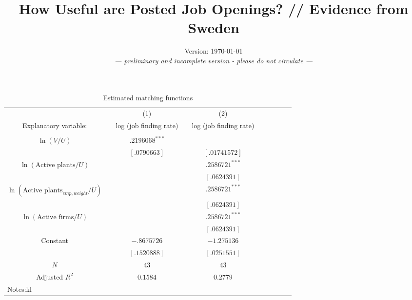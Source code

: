 \documentclass[11pt,article]{memoir}
\title{How Useful are Posted Job Openings? // Evidence from Sweden}
\date{Version: \today{}\\\emph{--- preliminary and incomplete version - please do not circulate ---}}
\begin{document}
\begin{table}%
\caption*{Estimated matching functions}
\begin{tabularx}{\linewidth}{cXcXcXcXcX}
\hline
&& (1)							
&& (2)					\\
Explanatory variable: 
&& log (job finding rate)
&& log (job finding rate) 	\\		
\hline 
\\
$\ln (V/U)$ 		
& & $ .2196068 ^{***}$          								
& & 	   				        							
& &\\[0 mm]
&&\scriptsize{$[.0790663]$}       
&&\scriptsize{$[.01741572]$}
\\
$\ln (\text{Active plants}/U)$
& 								
& 		
&	
&	$.2586721^{***}$						
\\[0 mm]
&&\scriptsize{$$}       
&&\scriptsize{$[.0624391]$}
\\
$\ln (\text{Active plants}_{emp,weight}/U)$                
& 								
& 		
&	
&	$.2586721^{***}$						
\\[0 mm]
&&\scriptsize{$$}       
&&\scriptsize{$[.0624391]$}
\\
$\ln (\text{Active firms}/U)$        
& 								
& 		
&	
&	$.2586721^{***}$						
\\[0 mm]
&&\scriptsize{$$}       
&&\scriptsize{$[.0624391]$}
\\		
Constant 
& & $-.8675726 $									
& & $-1.275136 $		
\\	[0 mm]
&&\scriptsize{$[.1520888 ]$}       
&&\scriptsize{$[.0251551 ]$} 
\\
$N $
& & $43$									
& & $43$		   				
\\	
Adjusted $R^2$
& & $0.1584$
& & $0.2779$		   				
\\		
\hline 
\multicolumn{3}{l}{Notes:kl}
\end{tabularx}
\end{table}
\end{document}
